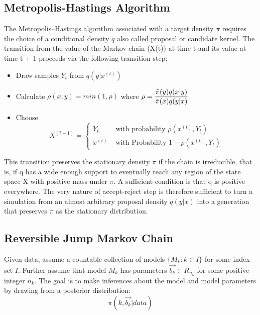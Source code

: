 \documentclass[12pt,a4paper]{article}
\begin{document}
\subsection{Metropolis-Hastings Algorithm}
The Metropolis–Hastings algorithm associated with a target density $\pi$ requires the choice of a conditional density $q$ also called proposal or candidate kernel. The transition from the value of the Markov chain (X(t)) at time t and its value at time t + 1 proceeds via the following transition step:
\begin{itemize}
    \item Draw samples $Y_t$ from $q(y|x^{(t)})$
    \item Calculate 
    $\rho(x,y)=min(1,\rho)$ where $\mathlarger{\rho=\frac{\Tilde{\pi}(y)q(x|y)}{\Tilde{\pi}(x)q(y|x)}}$
    \item Choose 
    $$ X^{(t+1)}=
           \begin{cases}
                Y_t     &\mbox{  with probability  }  \rho(x^{(t)},Y_t)\\
               x^{(t)}  &\mbox{  with Probability  }  1-\rho(x^{(t)},Y_t)
                 \end{cases}
    $$
\end{itemize}
This transition preserves the stationary density $\pi$ if the chain is irreducible, that is, if q has a wide enough support to eventually reach any region of the state space X with positive mass under $\pi$. A sufficient condition is that q is positive everywhere. The very nature of accept-reject step is therefore sufficient to turn a simulation from an almost arbitrary proposal density $q(y|x)$ into a generation that preserves $\pi$ as the stationary distribution.

\subsection{Reversible Jump Markov Chain}
Given data, assume a countable collection of models $\{M_k:k \in I \}$ for some index set $I$. Further assume that model $M_k$ has parameters $\overrightarrow{b_k} \in R_{n_k} $ for some positive integer $n_k$.
The goal is to make inferences about the model and model parameters by drawing from a posterior distribution:
$$\pi(k,\overrightarrow{b_k}|data)$$
\end{document}
